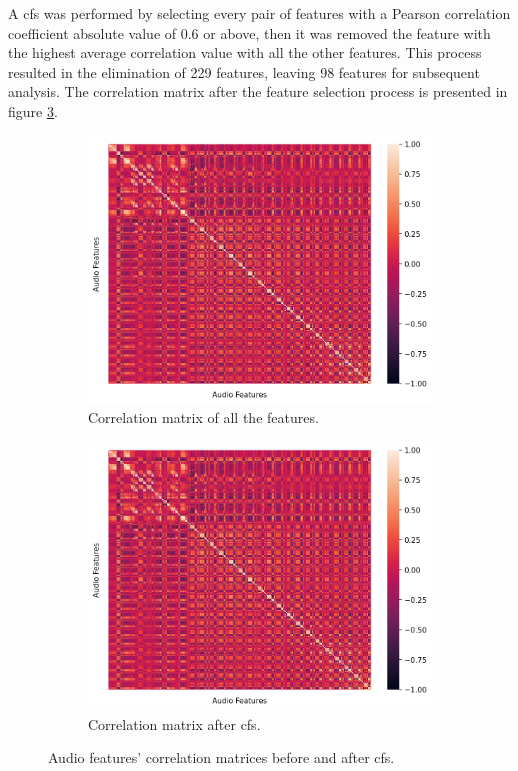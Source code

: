 A \ac{cfs} was performed by selecting every pair of features with a Pearson correlation coefficient absolute value of 0.6 or above, then it was removed the feature with the highest average correlation value with all the other features. This process resulted in the elimination of 229 features, leaving 98 features for subsequent analysis. The correlation matrix after the feature selection process is presented in figure \ref{fig:highAudioFeat}.

\begin{figure}[H]
	\begin{subfigure}{.5\textwidth}
		\centering
		\includegraphics[width=\linewidth]{figs/4_1_traditional/allCorrMatrix.png}
		\caption{Correlation matrix of all the features.}
		\label{fig:allAudioFeat}
	\end{subfigure}%
	\begin{subfigure}{.5\textwidth}
		\centering
		\includegraphics[width=\linewidth]{figs/4_1_traditional/highCorrMatrix.png}
		\caption{Correlation matrix after \ac{cfs}.}
		\label{fig:highAudioFeat}
	\end{subfigure}
	\caption{Audio features' correlation matrices before and after \ac{cfs}.}
\end{figure}

